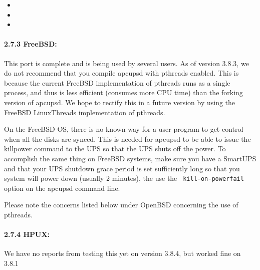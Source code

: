 \begin{itemize}
\item 
{}  
\item 
{}  
\item 
{} 
\end{itemize}

\label{FreeBSD}

\paragraph*{2.7.3 FreeBSD:}

\label{index-FreeBSD-36}
\label{index-OS_002c-FreeBSD-37}
This port is complete and is being used by several users. As of version 3.8.3,
we do not recommend that you compile apcupsd with pthreads enabled. This is
because the current FreeBSD implementation of pthreads runs as a single
process, and thus is less efficient (consumes more CPU time) than the forking
version of apcupsd. We hope to rectify this in a future version by using the
FreeBSD LinuxThreads implementation of pthreads.  

On the FreeBSD OS, there is no known way for a user program to get control
when all the disks are synced. This is needed for apcupsd to be able to issue
the killpower command to the UPS so that the UPS shuts off the power. To
accomplish the same thing on FreeBSD systems, make sure you have a SmartUPS
and that your UPS shutdown grace period is set sufficiently long so that you
system will power down (usually 2 minutes), the use the {\tt
kill-on-powerfail} option on the apcupsd command line.  

Please note the concerns listed below under OpenBSD concerning the use of
pthreads. 

\label{HPUX}

\paragraph*{2.7.4 HPUX:}

\label{index-HPUX-38}
\label{index-OS_002c-HPUX-39}
We have no reports from testing this yet on version 3.8.4, but worked fine on
3.8.1 

\label{NetBSD}

